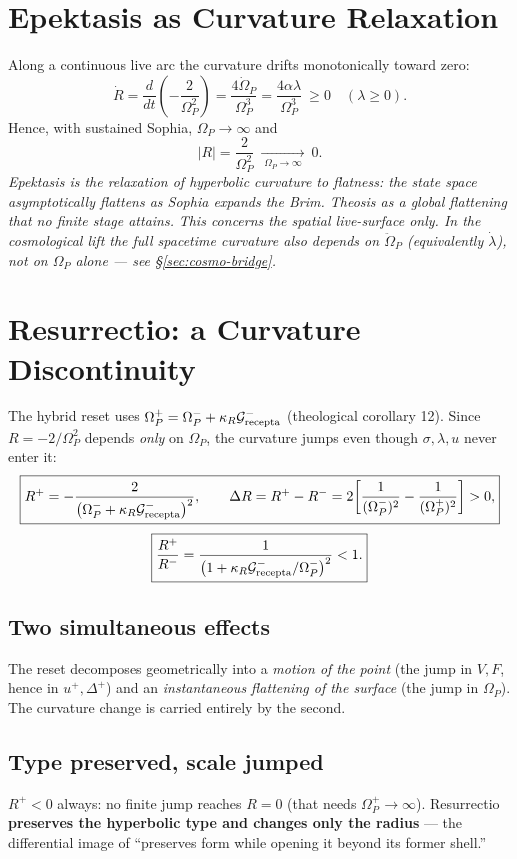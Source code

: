 \documentclass[11pt,a4paper]{article}
\newcommand{\Op}{\Omega_P}
\newcommand{\Grec}{\mathcal{G}_{\rm recepta}}
\newcommand{\note}[1]{\textcolor{black!65}{\emph{#1}}}
\theoremstyle{plain}
\theoremstyle{remark}
\theoremstyle{definition}
\begin{document}
\section{Epektasis as Curvature Relaxation}
Along a continuous live arc the curvature drifts monotonically toward zero:
\[
\boxed{\dot R=\frac{d}{dt}\!\left(-\frac{2}{\Op^2}\right)=\frac{4\dot\Op}{\Op^3}
=\frac{4\alpha\lambda}{\Op^3}\ \ge0\quad(\lambda\ge0).}
\]
Hence, with sustained Sophia, $\Op\to\infty$ and
\[
\boxed{|R|=\frac{2}{\Op^2}\ \xrightarrow[\;\Op\to\infty\;]{}\ 0.}
\]
\note{Epektasis is the relaxation of hyperbolic curvature to flatness: the state space asymptotically
flattens as Sophia expands the Brim. Theosis as a global flattening that no finite stage attains.}
\note{This concerns the \emph{spatial} live-surface only. In the cosmological lift the full spacetime
curvature also depends on $\ddot\Op$ (equivalently $\dot\lambda$), not on $\Op$ alone --- see
\S\ref{sec:cosmo-bridge}.}

\section{Resurrectio: a Curvature Discontinuity}\label{sec:reset}
The hybrid reset uses $\Op^+=\Op^-+\kappa_R\Grec^-$ (theological corollary 12). Since $R=-2/\Op^2$
depends \emph{only} on $\Op$, the curvature jumps even though $\sigma,\lambda,u$ never enter it:
\[
\boxed{R^+=-\frac{2}{\bigl(\Op^-+\kappa_R\Grec^-\bigr)^2},\qquad
\Delta R=R^+-R^-=2\!\left[\frac{1}{(\Op^-)^2}-\frac{1}{(\Op^+)^2}\right]>0,}
\]
\[
\boxed{\frac{R^+}{R^-}=\frac{1}{\bigl(1+\kappa_R\Grec^-/\Op^-\bigr)^2}<1.}
\]

\subsection*{Two simultaneous effects}
The reset decomposes geometrically into a \emph{motion of the point} (the jump in $V,F$, hence in
$u^+,\Delta^+$) and an \emph{instantaneous flattening of the surface} (the jump in $\Op$). The
curvature change is carried entirely by the second.

\subsection*{Type preserved, scale jumped}
$R^+<0$ always: no finite jump reaches $R=0$ (that needs $\Op^+\to\infty$). Resurrectio
\textbf{preserves the hyperbolic type and changes only the radius} --- the differential image of
``preserves form while opening it beyond its former shell.''
\end{document}
